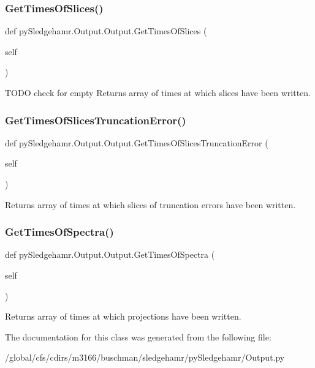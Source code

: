 \subsubsection{\texorpdfstring{Get\+Times\+Of\+Slices()}{GetTimesOfSlices()}}
{\footnotesize\ttfamily def py\+Sledgehamr.\+Output.\+Output.\+Get\+Times\+Of\+Slices (\begin{DoxyParamCaption}\item[{}]{self }\end{DoxyParamCaption})}



T\+O\+DO check for empty Returns array of times at which slices have been written. 

\mbox{\label{classpySledgehamr_1_1Output_1_1Output_a020d7c9eae9e35ab306f6709527d0349}} 
\subsubsection{\texorpdfstring{Get\+Times\+Of\+Slices\+Truncation\+Error()}{GetTimesOfSlicesTruncationError()}}
{\footnotesize\ttfamily def py\+Sledgehamr.\+Output.\+Output.\+Get\+Times\+Of\+Slices\+Truncation\+Error (\begin{DoxyParamCaption}\item[{}]{self }\end{DoxyParamCaption})}



Returns array of times at which slices of truncation errors have been written. 

\mbox{\label{classpySledgehamr_1_1Output_1_1Output_a537193eb3016273e943b4542924a0c07}} 
\subsubsection{\texorpdfstring{Get\+Times\+Of\+Spectra()}{GetTimesOfSpectra()}}
{\footnotesize\ttfamily def py\+Sledgehamr.\+Output.\+Output.\+Get\+Times\+Of\+Spectra (\begin{DoxyParamCaption}\item[{}]{self }\end{DoxyParamCaption})}



Returns array of times at which projections have been written. 



The documentation for this class was generated from the following file\+:\begin{DoxyCompactItemize}
\item 
/global/cfs/cdirs/m3166/buschman/sledgehamr/py\+Sledgehamr/Output.\+py\end{DoxyCompactItemize}
